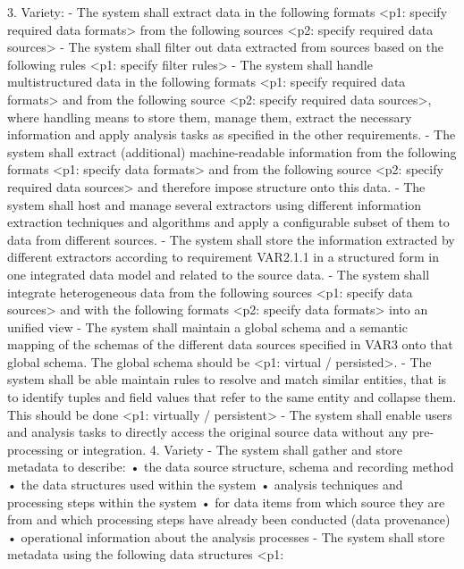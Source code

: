 \documentclass[conference]{IEEEtran}
\begin{document}
3. Variety: 
    - The system shall extract data in the following formats <p1: specify required
    data formats> from the following sources <p2: specify required data sources>
    - The system shall filter out data extracted from sources based on the following
    rules <p1: specify filter rules>
    - The system shall handle multistructured data in the following formats <p1:
    specify required data formats> and from the following source <p2: specify
    required data sources>, where handling means to store them, manage them,
    extract the necessary information and apply analysis tasks as specified in the
    other requirements.
    - The system shall extract (additional) machine-readable information from the
    following formats <p1: specify data formats> and from the following source
    <p2: specify required data sources> and therefore impose structure onto this
    data.
    - The system shall host and manage several extractors using different information
    extraction techniques and algorithms and apply a configurable subset of them
    to data from different sources.
    - The system shall store the information extracted by different extractors according to requirement VAR2.1.1 in a structured form in one integrated data
    model and related to the source data.
    - The system shall integrate heterogeneous data from the following sources
    <p1: specify data sources> and with the following formats <p2: specify data
    formats> into an unified view
    - The system shall maintain a global schema and a semantic mapping of the
    schemas of the different data sources specified in VAR3 onto that global schema.
    The global schema should be <p1: virtual / persisted>.
    - The system shall be able maintain rules to resolve and match similar entities,
    that is to identify tuples and field values that refer to the same entity and
    collapse them. This should be done <p1: virtually / persistent>
    - The system shall enable users and analysis tasks to directly access the original
    source data without any pre-processing or integration.
4. Variety 
    - The system shall gather and store metadata to describe:
        • the data source structure, schema and recording method
        • the data structures used within the system
        • analysis techniques and processing steps within the system
        • for data items from which source they are from and which processing
        steps have already been conducted (data provenance)
        • operational information about the analysis processes
    - The system shall store metadata using the following data structures <p1:
\end{document}
